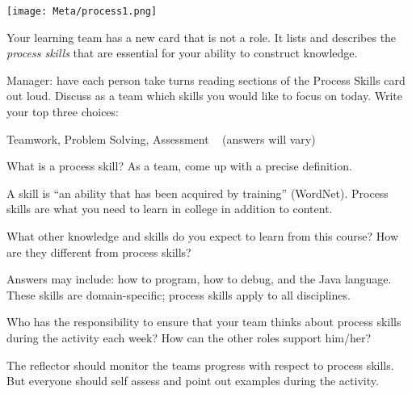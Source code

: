 
\begin{minipage}{0.45\textwidth}

\texttt{[image: Meta/process1.png]}

\end{minipage}
\hfill
\begin{minipage}{0.5\textwidth}

Your learning team has a new card that is not a role.
It lists and describes the \emph{process skills} that are essential for your ability to construct knowledge.

\end{minipage}



\Q Manager: have each person take turns reading sections of the Process Skills card out loud.
Discuss as a team which skills you would like to focus on today.
Write your top three choices:

\begin{answer}
Teamwork, Problem Solving, Assessment ~ (answers will vary)
\end{answer}


\Q What is a process skill?
As a team, come up with a precise definition.

\begin{answer}[5em]
A skill is ``an ability that has been acquired by training'' (WordNet).
Process skills are what you need to learn in college in addition to content.
\end{answer}


\Q What other knowledge and skills do you expect to learn from this course?
How are they different from process skills?

\begin{answer}[5em]
Answers may include: how to program, how to debug, and the Java language.
These skills are domain-specific; process skills apply to all disciplines.
\end{answer}


\Q Who has the responsibility to ensure that your team thinks about process skills during the activity each week?
How can the other roles support him/her?

\begin{answer}
The reflector should monitor the teams progress with respect to process skills.
But everyone should self assess and point out examples during the activity.
\end{answer}
